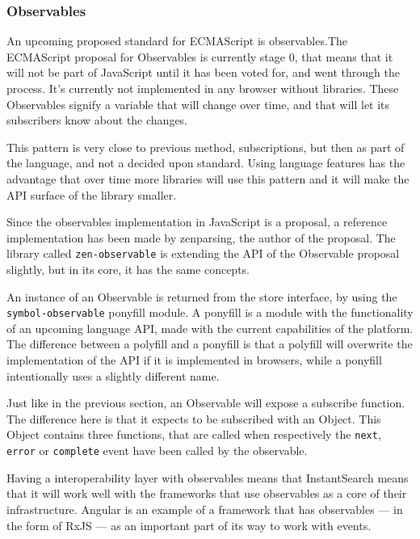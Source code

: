 \subsubsection{Observables}
\label{ssub:observables}

An upcoming proposed standard for ECMAScript is observables.The ECMAScript proposal for Observables is currently stage 0\cite{tc39-observable}, that means that it will not be part of JavaScript until it has been voted for, and went through the process. It's currently not implemented in any browser without libraries. These Observables signify a variable that will change over time, and that will let its subscribers know about the changes.

This pattern is very close to previous method, subscriptions, but then as part of the language, and not a decided upon standard. Using language features has the advantage that over time more libraries will use this pattern and it will make the API surface of the library smaller.

Since the observables implementation in JavaScript is a proposal, a reference implementation has been made by zenparsing, the author of the proposal. The library called {\tt zen-observable}\cite{zenparsing-observable} is extending the API of the Observable proposal slightly, but in its core, it has the same concepts.

An instance of an Observable is returned from the store interface, by using the {\tt symbol-observable}\cite{symbol-observable} ponyfill module. A ponyfill\cite{ponyfill} is a module with the functionality of an upcoming language API, made with the current capabilities of the platform. The difference between a polyfill and a ponyfill is that a polyfill will overwrite the implementation of the API if it is implemented in browsers, while a ponyfill intentionally uses a slightly different name.

Just like in the previous section, an Observable will expose a subscribe function. The difference here is that it expects to be subscribed with an Object. This Object contains three functions, that are called when respectively the {\tt next}, {\tt error} or {\tt complete} event have been called by the observable.

Having a interoperability layer with observables means that InstantSearch means that it will work well with the frameworks that use observables as a core of their infrastructure. Angular is an example of a framework that has observables --- in the form of RxJS\cite{angular-rx} --- as an important part of its way to work with events.


